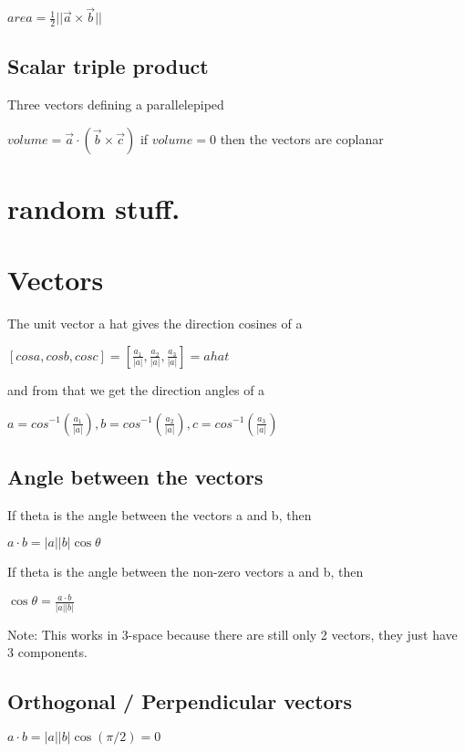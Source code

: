 \documentclass{extarticle}
\begin{document}
\begin{multicols}{2}
$area =\frac{1}{2}||\vec{a}\times \vec{b}||$

\subsection{Scalar triple product}
Three vectors defining a parallelepiped

$volume=\vec{a}\cdot(\vec{b}\times \vec{c})$
if $volume=0$ then the vectors are coplanar

\section{random stuff.}
\section{Vectors}

\begin{tcolorbox}[enhanced jigsaw,sharp corners,coltext=black,colback=Red!25!white,boxrule=0pt,breakable,size=minimal]
The unit vector a hat gives the direction cosines of a

$[cos a,cos b,cos c]=[\frac{a_1}{|a|},\frac{a_2}{|a|},\frac{a_3}{|a|}]= a hat$

and from that we get the direction angles of a

$a=cos^{-1}(\frac{a_1}{|a|}), b=cos^{-1}(\frac{a_2}{|a|}), c=cos^{-1}(\frac{a_3}{|a|})$
\end{tcolorbox}

\subsection{Angle between the vectors}

If theta is the angle between the vectors a and b, then

$a\cdot b=\left|a\right|\left|b\right|\cos{\theta}$

If theta is the angle between the non-zero vectors a and b, then

$\cos{\theta}=\frac{a\cdot b}{\left|a\right|\left|b\right|}$

Note: This works in 3-space because there are still only 2 vectors, they just have 3 components.

\subsection{Orthogonal / Perpendicular vectors}

$a\cdot b=\left|a\right|\left|b\right|\cos{\left(\pi/2\right)}=0$


\end{multicols}
\end{document}
